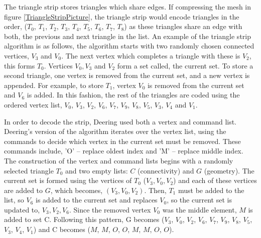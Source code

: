
The triangle strip stores triangles which share edges. If compressing the mesh in figure \ref{TriangleStripPicture}, the triangle strip would encode triangles in the order, ($T_0$, $T_1$, $T_2$, $T_3$, $T_4$, $T_5$, $T_6$, $T_7$, $T_8$) as these triangles share an edge with both, the previous and next triangle in the list. An example of the triangle strip algorithm is as follows, the algorithm starts with two randomly chosen connected vertices, $V_3$ and $V_0$. The next vertex which completes a triangle with these is $V_2$, this forms $T_0$. Vertices $V_0, V_3$ and $V_2$ form a set called, the current set. To store a second triangle, one vertex is removed from the current set, and a new vertex is appended. For example, to store $T_1$, vertex $V_0$ is removed from the current set and $V_6$ is added. In this fashion, the rest of the triangles are coded using the ordered vertex list, $V_0$, $V_3$, $V_2$, $V_6$, $V_7$, $V_9$, $V_8$, $V_5$, $V_3$, $V_4$ and $V_1$.

In order to decode the strip, Deering \cite{Deering95Geometry} used both a vertex and command list. Deering's version of the algorithm iterates over the vertex list, using the commands to decide which vertex in the current set must be removed. These commands include, 'O' -- replace oldest index and 'M' -- replace middle index. The construction of the vertex and command lists begins with a randomly selected triangle $T_0$ and two empty lists: $C$ (connectivity) and $G$ (geometry). The current set is formed using the vertices of $T_0$ ($V_3, V_0, V_2$) and each of these vertices are added to $G$, which becomes, $(V_3, V_0, V_2)$. Then, $T_1$ must be added to the list, so $V_6$ is added to the current set and replaces $V_0$, so the current set is updated to, ${V_3, V_2, V_6}$. Since the removed vertex $V_0$ was the middle element, $M$ is added to set C. Following this pattern, G becomes ($V_3$, $V_0$, $V_2$, $V_6$, $V_7$, $V_9$, $V_8$, $V_5$, $V_3$, $V_4$, $V_1$) and C becomes ($M$, $M$, $O$, $O$, $M$, $M$, $O$, $O$).


